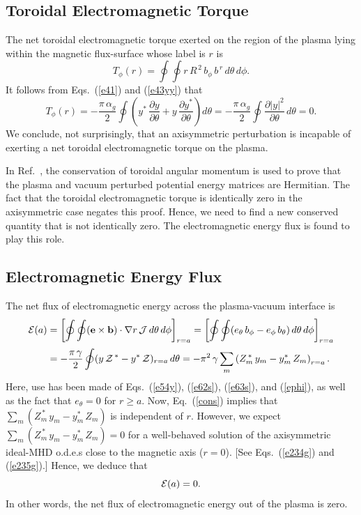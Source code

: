 \documentclass[12pt,prb,aps]{revtex4-1}
\begin{document}
\subsection{Toroidal Electromagnetic Torque}\label{storque}
The net toroidal electromagnetic torque exerted on the region of the plasma lying within the magnetic flux-surface whose label is $r$ is\,\cite{tj}
\begin{equation}
T_\phi(r)= \oint\oint r\,R^{\,2}\,b_\phi\,b^{\,r}\,d\theta\,d\phi.
\end{equation}
It follows from Eqs.~(\ref{e41}) and (\ref{e43yy}) that 
\begin{equation}
T_\phi(r) = -\frac{\pi\,\alpha_g}{2}\oint\left(y^\ast\,\frac{\partial y}{\partial\theta}+y\,\frac{\partial y^\ast}{\partial\theta}\right)d\theta
= -\frac{\pi\,\alpha_g}{2}\oint\frac{\partial|y|^2}{\partial\theta}\,d\theta = 0.
\end{equation}
We conclude, not surprisingly,  that an axisymmetric perturbation is incapable of exerting a net toroidal electromagnetic torque on the plasma. 

In Ref.~, the conservation of toroidal angular momentum is used to prove that the plasma and vacuum perturbed potential energy matrices are Hermitian.
The fact that the toroidal electromagnetic torque is identically  zero in the axisymmetric case negates this proof. Hence, we need to find a new conserved quantity
that is not identically zero. The electromagnetic energy flux is found to play this role. 

\subsection{Electromagnetic Energy Flux}\label{efluxx}
The net flux of electromagnetic energy across the plasma-vacuum interface is 
\begin{align}\label{eflux}
{\cal E}(a) &= \left[\oint\oint ({\bf e}\times {\bf b})\cdot\nabla r\,{\cal J}\,d\theta\,d\phi\right]_{r=a}= \left[\oint\oint (e_\theta\,b_\phi-e_\phi\,b_\theta)\,d\theta\,d\phi\right]_{r=a}\nonumber\\[0.5ex]
&=-\frac{\pi\,\gamma}{2}\oint (y\,{\cal Z}^{\,\ast}-y^\ast \,{\cal Z})_{r=a}\,d\theta=-\pi^2\,\gamma \sum_{m}\left(Z_m^{\,\ast}\,y_m-y_m^\ast\,Z_m\right)_{r=a}.
\end{align}
Here, use has been made of Eqs.~(\ref{e54y}), (\ref{e62s}), (\ref{e63s}),  and  (\ref{ephi}), as well as  the fact that $e_\theta=0$ for $r\geq a$. 
 Now, Eq.~(\ref{cons}) implies that
$\sum_m(Z_m^{\,\ast}\,y_m-y_m^\ast\,Z_m)$ is independent of $r$. However, we expect $\sum_m(Z_m^{\,\ast}\,y_m-y_m^\ast\,Z_m)=0$ for a well-behaved
solution of the axisymmetric ideal-MHD o.d.e.s close to the magnetic axis ($r=0$). [See Eqs.~(\ref{e234g}) and (\ref{e235g}).] Hence, we deduce that
\begin{equation}\label{excons}
{\cal E}(a) = 0.
\end{equation}
In other words, the net flux of electromagnetic energy out of the plasma is zero. 
\end{document}
